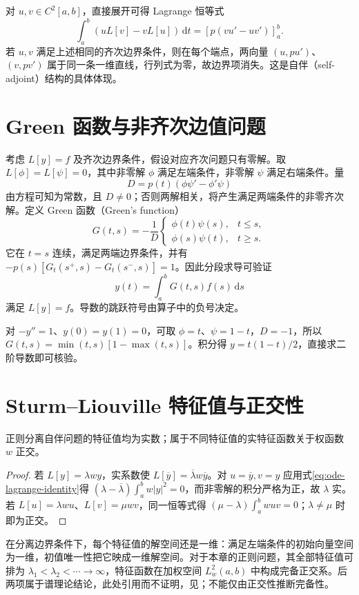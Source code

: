 对 $u,v\in C^2[a,b]$，直接展开可得 Lagrange 恒等式
\begin{equation}
 \int_a^b(uL[v]-vL[u])\,\mathrm dt
 =[p(vu'-uv')]_a^b.
 \label{eq:ode-lagrange-identity}
\end{equation}
若 $u,v$ 满足上述相同的齐次边界条件，则在每个端点，两向量 $(u,pu')$、$(v,pv')$ 属于同一条一维直线，行列式为零，故边界项消失。这是自伴（self-adjoint）结构的具体体现。

\section{Green 函数与非齐次边值问题}
考虑 $L[y]=f$ 及齐次边界条件，假设对应齐次问题只有零解。取 $L[\phi]=L[\psi]=0$，其中非零解 $\phi$ 满足左端条件，非零解 $\psi$ 满足右端条件。量
\[
 D=p(t)(\phi\psi'-\phi'\psi)
\]
由方程可知为常数，且 $D\ne0$；否则两解相关，将产生满足两端条件的非零齐次解。定义 Green 函数（Green's function）
\[
 G(t,s)=-\frac1D
 \begin{cases}\phi(t)\psi(s),&t\leq s,\\\phi(s)\psi(t),&t\geq s.\end{cases}
\]
它在 $t=s$ 连续，满足两端边界条件，并有 $-p(s)[G_t(s^+,s)-G_t(s^-,s)]=1$。因此分段求导可验证
\[
 y(t)=\int_a^bG(t,s)f(s)\,\mathrm ds
\]
满足 $L[y]=f$。导数的跳跃符号由算子中的负号决定。

\begin{example}
对 $-y''=1$、$y(0)=y(1)=0$，可取 $\phi=t$、$\psi=1-t$，$D=-1$，所以 $G(t,s)=\min(t,s)[1-\max(t,s)]$。积分得 $y=t(1-t)/2$，直接求二阶导数即可核验。
\end{example}

\section{Sturm--Liouville 特征值与正交性}
\begin{theorem}
正则分离自伴问题的特征值均为实数；属于不同特征值的实特征函数关于权函数 $w$ 正交。
\end{theorem}
\begin{proof}
若 $L[y]=\lambda wy$，实系数使 $L[\overline y]=\overline\lambda w\overline y$。对 $u=\overline y,v=y$ 应用式\eqref{eq:ode-lagrange-identity}得 $(\lambda-\overline\lambda)\int_a^bw|y|^2=0$，而非零解的积分严格为正，故 $\lambda$ 实。若 $L[u]=\lambda wu$、$L[v]=\mu wv$，同一恒等式得 $(\mu-\lambda)\int_a^bwuv=0$；$\lambda\ne\mu$ 时即为正交。
\end{proof}

在分离边界条件下，每个特征值的解空间还是一维：满足左端条件的初始向量空间为一维，初值唯一性把它映成一维解空间。对于本章的正则问题，其全部特征值可排为 $\lambda_1<\lambda_2<\cdots\to\infty$，特征函数在加权空间 $L^2_w(a,b)$ 中构成完备正交系。后两项属于谱理论结论，此处引用而不证明，见\cite[第5章]{teschl-ode}；不能仅由正交性推断完备性。

